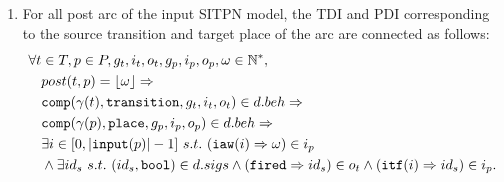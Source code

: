 \begin{definition}
\begin{enumerate}[resume]
    
  \item For all post arc of the input SITPN model, the TDI and PDI
    corresponding to the source transition and target place of the arc
    are connected as follows:
    \begin{equation*}
      \begin{aligned}[t]
        \forall{}t&\in{}T,p\in{}P,g_t,i_t,o_t,g_p,i_p,o_p,\omega\in\mathbb{N}^{*}, \\
                  & post(t,p)=\lfloor\omega\rfloor\Rightarrow \\
                  & \mathtt{comp}(\gamma(t),\mathtt{transition},g_t,i_t,o_t)\in{}d.beh\Rightarrow \\
                  & \mathtt{comp}(\gamma(p),\mathtt{place},g_p,i_p,o_p)\in{}d.beh\Rightarrow\\
                  & \exists{}i\in[0,\vert\mathtt{input}(p)\vert-1]~s.t.~(\mathtt{iaw}(i)\Rightarrow\omega)\in{}i_p \\
                  & \land\exists{}id_s~s.t.~(id_s,\mathtt{bool})\in{}d.sigs
                    \land(\mathtt{fired}\Rightarrow{}id_s)\in{}o_t\land(\mathtt{itf}(i)\Rightarrow{}id_s)\in{}i_p. \\
      \end{aligned}
    \end{equation*}


\end{enumerate}
\end{definition}
